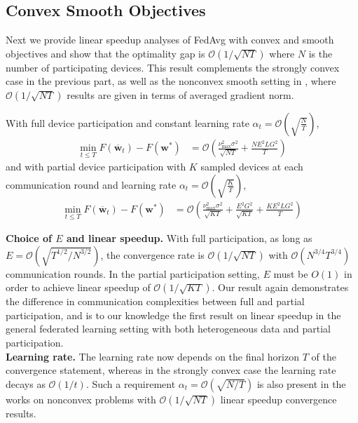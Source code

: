 \subsection{Convex Smooth Objectives}
Next we provide linear speedup analyses of FedAvg with convex and
smooth objectives and show that the optimality gap is $\mathcal{O}(1/\sqrt{NT})$
where $N$ is the number of participating devices. This result complements
the strongly convex case in the previous part, as well as the nonconvex
smooth setting in \cite{jiang2018linear,yu2019parallel,haddadpour2019convergence},
where $\mathcal{O}(1/\sqrt{NT})$ results are given in terms of averaged
gradient norm. 
\begin{theorem}
	\label{thm:SGD_cvx}With full device participation and constant learning
	rate $\alpha_{t}=\mathcal{O}(\sqrt{\frac{N}{T}})$, 
	\begin{align*}
	\min_{t\leq T}F(\overline{\mathbf{w}}_{t})-F(\mathbf{w}^{\ast}) & =\mathcal{O}\left(\frac{\nu_{\max}^{2}\sigma^{2}}{\sqrt{NT}}+\frac{NE^{2}LG^{2}}{T}\right)
	\end{align*}
	and with partial device participation with $K$ sampled devices at
	each communication round and learning rate $\alpha_{t}=\mathcal{O}(\sqrt{\frac{K}{T}})$,
	\begin{align*}
	\min_{t\leq T}F(\overline{\mathbf{w}}_{t})-F(\mathbf{w}^{\ast}) & =\mathcal{O}\left(\frac{\nu_{\max}^{2}\sigma^{2}}{\sqrt{KT}}+\frac{E^{2}G^{2}}{\sqrt{KT}}+\frac{KE^{2}LG^{2}}{T}\right)
	\end{align*}
\end{theorem}
%
\textbf{Choice of $E$ and linear speedup. }With full participation,
as long as $E=\mathcal{O}(\sqrt{T^{1/2}/N^{3/2}})$, the convergence
rate is $\mathcal{O}(1/\sqrt{NT})$ with $\mathcal{O}(N^{3/4}T^{3/4})$
communication rounds. In the partial participation setting, $E$ must
be $O(1)$ in order to achieve linear speedup of $\mathcal{O}(1/\sqrt{KT})$.
Our result again demonstrates the difference in communication complexities
between full and partial participation, and is to our knowledge the
first result on linear speedup in the general federated learning setting
with both heterogeneous data and partial participation. \\
\textbf{Learning rate. }The learning rate now depends on the final
horizon $T$ of the convergence statement, whereas in the strongly
convex case the learning rate decays as $\mathcal{O}(1/t)$. Such
a requirement $\alpha_{t}=\mathcal{O}(\sqrt{N/T})$ is also present
in the works \cite{haddadpour2019convergence,yu2019parallel} on nonconvex
problems with $\mathcal{O}(1/\sqrt{NT})$ linear speedup convergence results. 